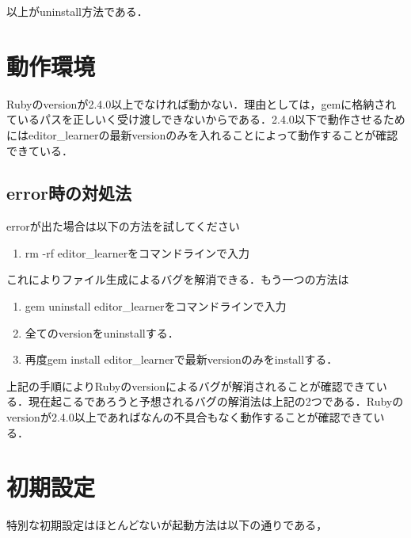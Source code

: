 以上がuninstall方法である．

    \section{動作環境}\label{ux52d5ux4f5cux74b0ux5883}

    Rubyのversionが2.4.0以上でなければ動かない．理由としては，gemに格納されているパスを正しいく受け渡しできないからである．2.4.0以下で動作させるためにはeditor\_learnerの最新versionのみを入れることによって動作することが確認できている．

\subsection{error時の対処法}\label{errorux6642ux306eux5bfeux51e6ux6cd5}

errorが出た場合は以下の方法を試してください

\begin{enumerate}
\def\labelenumi{\arabic{enumi}.}
\tightlist
\item
  rm -rf editor\_learnerをコマンドラインで入力
\end{enumerate}

これによりファイル生成によるバグを解消できる．もう一つの方法は

\begin{enumerate}
\def\labelenumi{\arabic{enumi}.}
\tightlist
\item
  gem uninstall editor\_learnerをコマンドラインで入力
\item
  全てのversionをuninstallする．
\item
  再度gem install editor\_learnerで最新versionのみをinstallする．
\end{enumerate}

上記の手順によりRubyのversionによるバグが解消されることが確認できている．現在起こるであろうと予想されるバグの解消法は上記の2つである．Rubyのversionが2.4.0以上であればなんの不具合もなく動作することが確認できている．

    \section{初期設定}\label{ux521dux671fux8a2dux5b9a}

    特別な初期設定はほとんどないが起動方法は以下の通りである，

